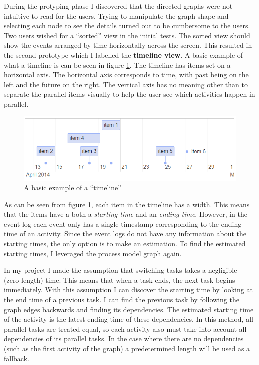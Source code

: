 During the protyping phase I discovered that the directed graphs were not intuitive to read for the users.
Trying to manipulate the graph shape and selecting each node to see the details turned out to be cumbersome to the users.
Two users wished for a ``sorted'' view in the initial tests.
The sorted view should show the events arranged by time horizontally across the screen.
This resulted in the second prototype which I labelled the \textbf{timeline view}.
A basic example of what a timeline is can be seen in figure \ref{fig:basictimeline}.
The timeline has items set on a horizontal axis.
The horizontal axis corresponds to time, with past being on the left and the future on the right.
The vertical axis has no meaning other than to separate the parallel items visually to help the user see which activities happen in parallel.

\begin{figure}[htb]
    \centering \includegraphics[width=0.6\linewidth]{gfx/screenshots/basictimeline.png}
    \caption{A basic example of a ``timeline'' }
    \label{fig:basictimeline}
\end{figure}

As can be seen from figure \ref{fig:basictimeline}, each item in the timeline has a width.
This means that the items have a both a \textit{starting time} and an \textit{ending time}.
However, in the event log each event only has a single timestamp corresponding to the ending time of an activity.
Since the event logs do not have any information about the starting times, the only option is to make an estimation.
To find the estimated starting times, I leveraged the process model graph again.

In my project I made the assumption that switching tasks takes a negligible (zero-length) time.
This means that when a task ends, the next task begins immediately.
With this assumption I can discover the starting time by looking at the end time of a previous task.
I can find the previous task by following the graph edges backwards and finding its dependencies.
The estimated starting time of the activity is the latest ending time of these dependencies.
In this method, all parallel tasks are treated equal, so each activity also must take into account all dependencies of its parallel tasks.
In the case where there are no dependencies (such as the first activity of the graph) a predetermined length will be used as a fallback.

